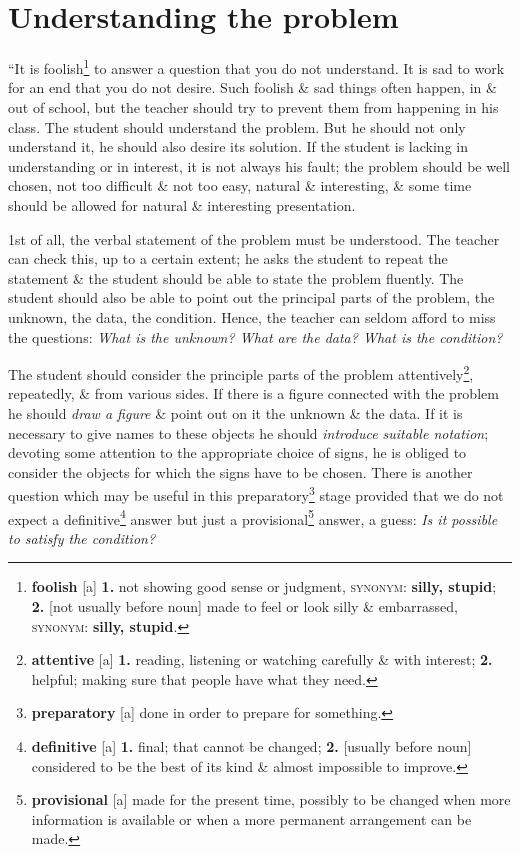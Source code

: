 \documentclass[oneside]{book}
\numberwithin{equation}{section}
\begin{document}
\section{Understanding the problem}
``It is foolish\footnote{\textbf{foolish} [a] \textbf{1.} not showing good sense or judgment, \textsc{synonym}: \textbf{silly, stupid}; \textbf{2.} [not usually before noun] made to feel or look silly \& embarrassed, \textsc{synonym}: \textbf{silly, stupid}.} to answer a question that you do not understand. It is sad to work for an end that you do not desire. Such foolish \& sad things often happen, in \& out of school, but the teacher should try to prevent them from happening in his class. The student should understand the problem. But he should not only understand it, he should also desire its solution. If the student is lacking in understanding or in interest, it is not always his fault; the problem should be well chosen, not too difficult \& not too easy, natural \& interesting, \& some time should be allowed for natural \& interesting presentation.

1st of all, the verbal statement of the problem must be understood. The teacher can check this, up to a certain extent; he asks the student to repeat the statement \& the student should be able to state the problem fluently. The student should also be able to point out the principal parts of the problem, the unknown, the data, the condition. Hence, the teacher can seldom afford to miss the questions: \textit{What is the unknown? What are the data? What is the condition?}

The student should consider the principle parts of the problem attentively\footnote{\textbf{attentive} [a] \textbf{1.} reading, listening or watching carefully \& with interest; \textbf{2.} helpful; making sure that people have what they need.}, repeatedly, \& from various sides. If there is a figure connected with the problem he should \textit{draw a figure} \& point out on it the unknown \& the data. If it is necessary to give names to these objects he should \textit{introduce suitable notation}; devoting some attention to the appropriate choice of signs, he is obliged to consider the objects for which the signs have to be chosen. There is another question which may be useful in this preparatory\footnote{\textbf{preparatory} [a] done in order to prepare for something.} stage provided that we do not expect a definitive\footnote{\textbf{definitive} [a] \textbf{1.} final; that cannot be changed; \textbf{2.} [usually before noun] considered to be the best of its kind \& almost impossible to improve.} answer but just a provisional\footnote{\textbf{provisional} [a] made for the present time, possibly to be changed when more information is available or when a more permanent arrangement can be made.} answer, a guess: \textit{Is it possible to satisfy the condition?}
\end{document}
